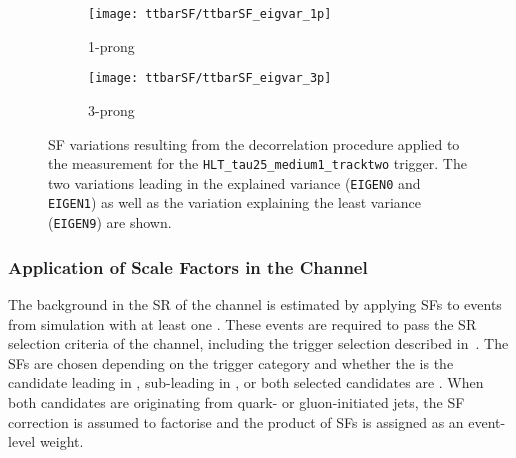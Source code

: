\begin{figure}[htbp]
  \centering

  \begin{subfigure}[t]{.495\textwidth}
    \texttt{[image: ttbarSF/ttbarSF\_eigvar\_1p]}
    \caption{1-prong \tauhadvis}%
    \label{fig:ttbarSF_eigenvariations_1p}
  \end{subfigure}\hfill%
  \begin{subfigure}[t]{.495\textwidth}
    \texttt{[image: ttbarSF/ttbarSF\_eigvar\_3p]}
    \caption{3-prong \tauhadvis}%
    \label{fig:ttbarSF_eigenvariations_3p}
  \end{subfigure}


  \caption[Systematic variations of the \faketauhadvis SFs for the
  \texttt{HLT\_tau25\_medium1\_tracktwo} trigger.]{\Faketauhadvis SF variations
    resulting from the decorrelation procedure applied to the measurement for
    the \texttt{HLT\_tau25\_medium1\_tracktwo} trigger. The two variations
    leading in the explained variance (\texttt{EIGEN0} and \texttt{EIGEN1}) as
    well as the variation explaining the least variance (\texttt{EIGEN9}) are
    shown.}%
  \label{fig:ttbarSF_eigenvariations}
\end{figure}


\subsubsection{Application of \Faketauhadvis Scale Factors in the \hadhad
  Channel}

The \ttbarFakes background in the SR of the \hadhad channel is estimated by
applying \faketauhadvis SFs to \ttbar events from simulation with at least one
\faketauhadvis. These events are required to pass the SR selection criteria of
the \hadhad channel, including the trigger selection described
in~. The SFs are chosen depending on the trigger category and
whether the \faketauhadvis is the \tauhadvis candidate leading in \pT,
sub-leading in \pT, or both selected candidates are \faketauhadvis. When both
\tauhadvis candidates are originating from quark- or gluon-initiated jets, the
SF correction is assumed to factorise and the product of SFs is assigned as an
event-level weight.

